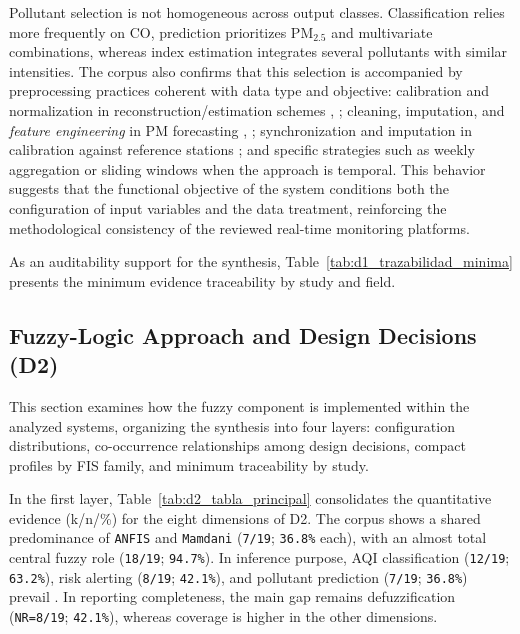 Pollutant selection is not homogeneous across output classes. Classification relies more frequently on CO, prediction prioritizes PM$_{2.5}$ and multivariate combinations, whereas index estimation integrates several pollutants with similar intensities. The corpus also confirms that this selection is accompanied by preprocessing practices coherent with data type and objective: calibration and normalization in reconstruction/estimation schemes \cite{A001}, \cite{A167}; cleaning, imputation, and \emph{feature engineering} in PM forecasting \cite{A135}, \cite{A138}; synchronization and imputation in calibration against reference stations \cite{A084}; and specific strategies such as weekly aggregation \cite{A009} or sliding windows \cite{A157} when the approach is temporal. This behavior suggests that the functional objective of the system conditions both the configuration of input variables and the data treatment, reinforcing the methodological consistency of the reviewed real-time monitoring platforms.

As an auditability support for the synthesis, Table~\ref{tab:d1_trazabilidad_minima} presents the minimum evidence traceability by study and field.



\subsection{Fuzzy-Logic Approach and Design Decisions (D2)}
This section examines how the fuzzy component is implemented within the analyzed systems, organizing the synthesis into four layers: configuration distributions, co-occurrence relationships among design decisions, compact profiles by FIS family, and minimum traceability by study.

In the first layer, Table~\ref{tab:d2_tabla_principal} consolidates the quantitative evidence (k/n/\%) for the eight dimensions of D2. The corpus shows a shared predominance of \texttt{ANFIS} and \texttt{Mamdani} (\texttt{7/19}; \texttt{36.8\%} each), with an almost total central fuzzy role (\texttt{18/19}; \texttt{94.7\%}). In inference purpose, AQI classification (\texttt{12/19}; \texttt{63.2\%}), risk alerting (\texttt{8/19}; \texttt{42.1\%}), and pollutant prediction (\texttt{7/19}; \texttt{36.8\%}) prevail \cite{A084, A132, A149, A168}. In reporting completeness, the main gap remains defuzzification (\texttt{NR=8/19}; \texttt{42.1\%}), whereas coverage is higher in the other dimensions.

